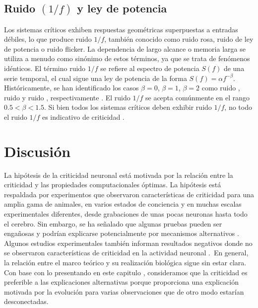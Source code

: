 \subsection{Ruido $(1/ f )$ y ley de potencia}

Los sistemas críticos exhiben respuestas geométricas superpuestas a entradas débiles, lo que produce ruido $1/f$, también conocido como ruido rosa, ruido de ley de potencia o ruido flicker. La dependencia de largo alcance o memoria larga se utiliza a menudo como sinónimo de estos términos, ya que se trata de fenómenos idénticos. El término ruido $1/f$ se refiere al espectro de potencia $S(f)$ de una serie temporal, el cual sigue una ley de potencia de la forma $S( f ) = \alpha f^{-\beta}$. Históricamente, se han identificado los casos $\beta=0$, $\beta=1$, $\beta=2$ como ruido , ruido   y ruido , respectivamente \cite{li_fractal_2005}. El ruido $1/f$ se acepta comúnmente en el rango  $0.5 < \beta < 1.5$. Si bien todos los sistemas críticos deben exhibir ruido $1/f$, no todo el ruido $1/f$ es indicativo de criticidad \cite{bedard_does_2006,hesse_self-organized_2014}. 



\section{Discusión}

La hipótesis de la criticidad neuronal está motivada por la relación entre la criticidad y las propiedades computacionales óptimas. La hipótesis está respaldada por experimentos que observaron características de criticidad para una amplia gama de animales, en varios estados de conciencia y en muchas escalas experimentales diferentes, desde grabaciones de unas pocas neuronas hasta todo el cerebro.  Sin embargo, se ha señalado que algunas pruebas pueden ser engañosas \cite{clauset_power-law_2009} y podrían explicarse potencialmente por mecanismos alternativos \cite{botcharova_power-law_2012,galinsky_neuronal_2023}. Algunos estudios experimentales también informan resultados negativos donde no se observaron características de criticidad en la actividad neuronal  \cite{yu_scale-invariant_2014,bedard_does_2006,dehghani_avalanche_2012}. En general, la relación entre el marco teórico y su realización biológica sigue sin estar clara.  Con base con lo presentando en este capitulo , consideramos que la criticidad es preferible a las explicaciones alternativas porque proporciona una explicación motivada por la evolución para varias observaciones que de otro modo estarían desconectadas.

